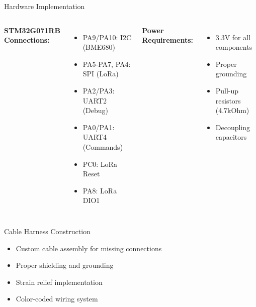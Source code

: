 \documentclass[aspectratio=169]{beamer}
\begin{document}
\begin{frame}{Hardware Implementation}
\begin{columns}
\textbf{STM32G071RB Connections:}
\begin{itemize}
    \item PA9/PA10: I2C (BME680)
    \item PA5-PA7, PA4: SPI (LoRa)
    \item PA2/PA3: UART2 (Debug)
    \item PA0/PA1: UART4 (Commands)
    \item PC0: LoRa Reset
    \item PA8: LoRa DIO1
\end{itemize}

\textbf{Power Requirements:}
\begin{itemize}
    \item 3.3V for all components
    \item Proper grounding
    \item Pull-up resistors (4.7kOhm)
    \item Decoupling capacitors
\end{itemize}
\end{columns}

\begin{block}{Cable Harness Construction}
\begin{itemize}
    \item Custom cable assembly for missing connections
    \item Proper shielding and grounding
    \item Strain relief implementation
    \item Color-coded wiring system
\end{itemize}
\end{block}
\end{frame}
\end{document}
